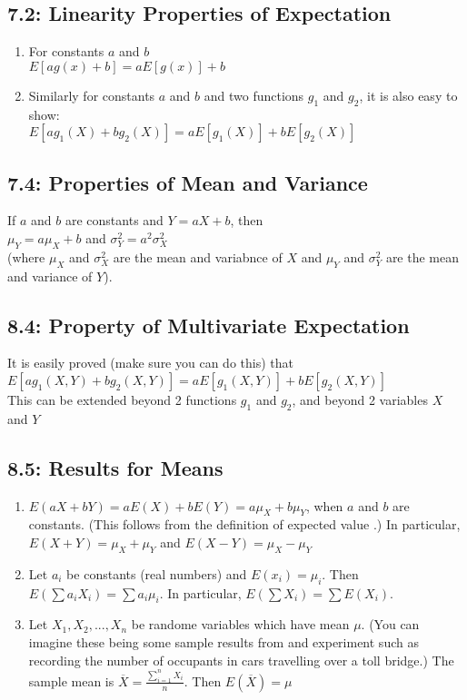 \documentclass[11pt]{article}
\begin{document}
	\subsection*{7.2: Linearity Properties of Expectation}
		\begin{enumerate}
			\item For constants $a$ and $b$		\\
			$E[ag(x)+b]=aE[g(x)]+b$
			\item Similarly for constants $a$ and $b$ and two functions $g_1$ and $g_2$, it is also easy to show:\\
			$E[ag_1(X)+bg_2(X)]=aE[g_1(X)]+bE[g_2(X)]$
		\end{enumerate}
	
	
	\subsection*{7.4: Properties of Mean and Variance}
		If $a$ and $b$ are constants and $Y = aX+b$, then\\
		$\mu_Y=a\mu_X + b$ and $\sigma^2_Y=a^2 \sigma^2_X$\\
		(where $\mu_X$ and $\sigma^2_X$ are the mean and variabnce of $X$ and $\mu_Y$ and $\sigma^2_Y $ are the mean and variance of $Y$).

     \subsection*{8.4: Property of Multivariate Expectation}
     	It is easily proved (make sure you can do this) that\\
     	$E[ag_1(X,Y)+bg_2(X,Y)]=aE[g_1(X,Y)]+bE[g_2(X,Y)]$\\
     	This can be extended beyond 2 functions $g_1$ and $g_2$, and beyond 2 variables $X$ and $Y$
     	
     \subsection*{8.5: Results for Means}
     	\begin{enumerate}
     		\item $E(aX+bY)=aE(X)+bE(Y) = a\mu_X+b\mu_Y$, when $a$ and $b$ are constants. (This follows from the definition of expected value .) In particular, $E(X+Y) = \mu_X +\mu_Y$ and $E(X-Y)=\mu_X-\mu_Y$
     		\item Let $a_i$ be constants (real numbers) and $E(x_i) = \mu_i$. Then $E(\sum a_iX_i)=\sum a_i\mu_i$. In particular, $E(\sum X_i)=\sum E(X_i)$.
     		\item Let $X_1,X_2,...,X_n$ be randome variables which have mean $\mu$. (You can imagine these being some sample results from and experiment such as recording the number of occupants in cars travelling over a toll bridge.) The sample mean is $\overline{X}=\frac{\sum^n_{i=1}X_i}{n}$. Then $E(\overline{X}) = \mu$
     	\end{enumerate}
     
\end{document}

